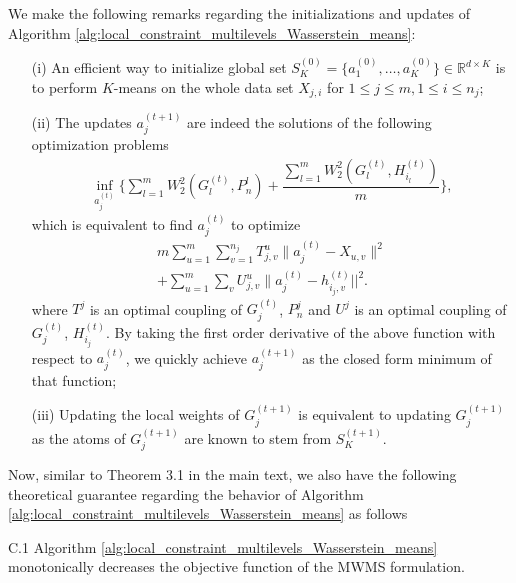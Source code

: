 We make the following remarks regarding the initializations and updates of Algorithm \ref{alg:local_constraint_multilevels_Wasserstein_means}: 
\begin{itemize}
\item[(i)] An efficient way to 
initialize global set $S_{K}^{(0)}=\biggr\{a_{1}^{(0)},\ldots,a_{K}^{(0)}\biggr\} \in 
\mathbb{R}^{d \times K}$ is to perform $K$-means on the whole data set $X_{j,i}$ for $1 
\leq j \leq m, 1 \leq i \leq n_{j}$; 
\item[(ii)] The updates $a_{j}^{(t+1)}$ are indeed the solutions 
of the following optimization problems
\begin{eqnarray}
\inf \limits_{a_{j}^{(t)}}\biggr\{\sum \limits_{l=1}^{m}{W_{2}^{2}(G_{l}^{(t)},P_{n}^{l})}+\dfrac{\sum \limits_{l=1}^{m}{W_{2}^{2}(G_{l}^{(t)},H_{i_{l}}^{(t)})}}{m}\biggr\}, \nonumber
\end{eqnarray}
which is equivalent to find $a_{j}^{(t)}$ to optimize 
\begin{eqnarray}
m \sum \limits_{u=1}^{m}{\sum \limits_{v=1}^{n_{j}}{T_{j,v}^{u}\|a_{j}^{(t)}-X_{u,v}\|^{2}}} \nonumber \\
+\sum \limits_{u=1}^{m}{\sum \limits_{v}{U_{j,v}^{u}\|a_{j}^{(t)}-h_{i_{j},v}^{(t)}||^{2}}}.\nonumber
\end{eqnarray}
where $T^{j}$ is an optimal coupling of $G_{j}^{(t)}$, $P_{n}^{j}$ and $U^{j}$ is an optimal coupling of $G_{j}^{(t)}$, $H_{i_{j}}^{(t)}$. By taking the first order derivative of the above function with respect to $a_{j}^{(t)}$, we quickly achieve $a_{j}^{(t+1)}$ as the closed form minimum of that function;
\item[(iii)] Updating the local weights of $G_{j}^{(t+1)}$ is equivalent to updating $G_{j}^{(t+1)}$ as 
the atoms of $G_{j}^{(t+1)}$ are known to stem from $S_{K}^{(t+1)}$. 
\end{itemize}
Now, similar to 
Theorem 3.1 in the main text, we also have the following theoretical 
guarantee regarding the behavior of Algorithm \ref{alg:local_constraint_multilevels_Wasserstein_means} as follows
\begin{customthm}{C.1} \label{theorem:local_convergence_local_constraint_Kmeans} Algorithm 
\ref{alg:local_constraint_multilevels_Wasserstein_means} monotonically decreases the 
objective function of  
the MWMS formulation.
\end{customthm}
